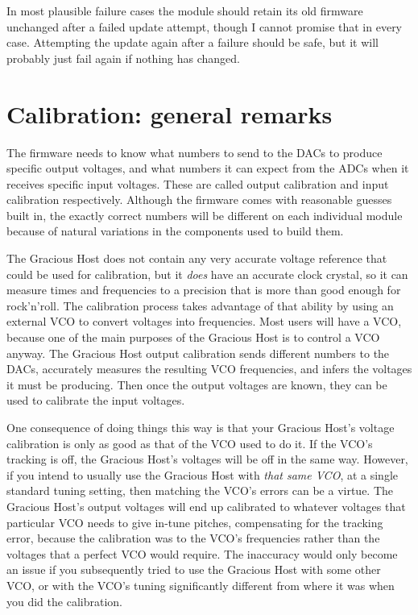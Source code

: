 In most plausible failure cases the module should retain its old firmware
unchanged after a failed update attempt, though I cannot promise that in
every case.  Attempting the update again after a failure should be safe, but
it will probably just fail again if nothing has changed.

\section{Calibration:  general remarks}

The firmware needs to know what numbers to send to the DACs to produce
specific output voltages, and what numbers it can expect from the ADCs when
it receives specific input voltages.  These are called output calibration
and input calibration respectively.  Although the firmware comes with
reasonable guesses built in, the exactly correct numbers will be different
on each individual module because of natural variations in the components
used to build them.

The Gracious Host does not contain any very accurate voltage reference that
could be used for calibration, but it \emph{does} have an accurate clock
crystal, so it can measure times and frequencies to a precision that is more
than good enough for rock'n'roll.  The calibration process takes advantage
of that ability by using an external VCO to convert voltages into
frequencies.  Most users will have a VCO, because one of the main purposes
of the Gracious Host is to control a VCO anyway.  The Gracious Host output
calibration sends different numbers to the DACs, accurately measures the
resulting VCO frequencies, and infers the voltages it must be producing. 
Then once the output voltages are known, they can be used to calibrate the
input voltages.

One consequence of doing things this way is that your Gracious Host's
voltage calibration is only as good as that of the VCO used to do it.  If
the VCO's tracking is off, the Gracious Host's voltages will be off in the
same way.  However, if you intend to usually use the Gracious Host with
\emph{that same VCO}, at a single standard tuning setting, then matching the
VCO's errors can be a virtue.  The Gracious Host's output voltages will end
up calibrated to whatever voltages that particular VCO needs to give in-tune
pitches, compensating for the tracking error, because the calibration was to
the VCO's frequencies rather than the voltages that a perfect VCO would
require.  The inaccuracy would only become an issue if you subsequently
tried to use the Gracious Host with some other VCO, or with the VCO's tuning
significantly different from where it was when you did the calibration.

